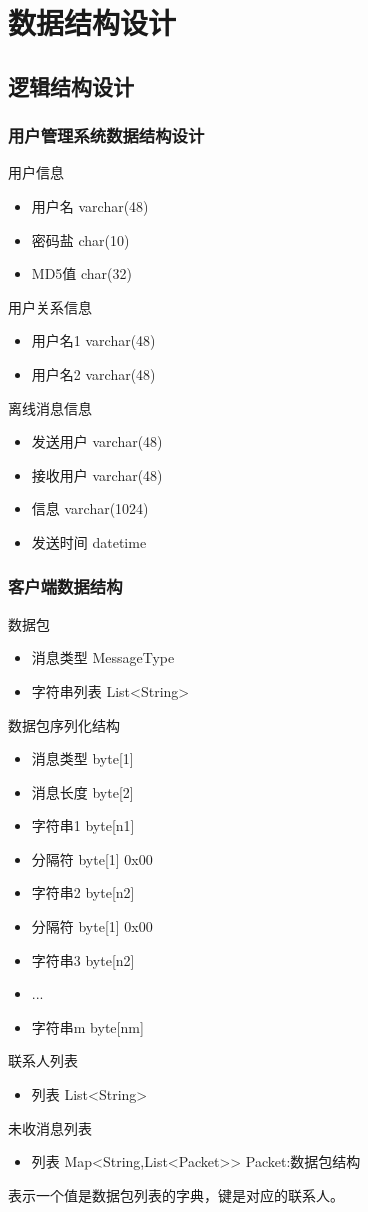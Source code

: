 \chapter{数据结构设计}
\section{逻辑结构设计}
\subsection{用户管理系统数据结构设计}
用户信息
	\begin{itemize}  	
		\item 用户名 varchar(48)
		\item 密码盐 char(10)
		\item MD5值 char(32)
	\end{itemize}
用户关系信息
	\begin{itemize}  	
		\item 用户名1 varchar(48)
		\item 用户名2 varchar(48)
\end{itemize}
离线消息信息
	\begin{itemize}
		\item 发送用户 varchar(48)
		\item 接收用户 varchar(48)
		\item 信息     varchar(1024)
		\item 发送时间 datetime
	\end{itemize}	
\subsection{客户端数据结构}
数据包
	\begin{itemize}
		\item 消息类型 MessageType
		\item 字符串列表 List<String>
	\end{itemize}	
数据包序列化结构
	\begin{itemize}
		\item 消息类型 byte[1]
		\item 消息长度 byte[2]
		\item 字符串1  byte[n1]
		\item 分隔符   byte[1] 0x00 
		\item 字符串2  byte[n2]
		\item 分隔符   byte[1] 0x00
		\item 字符串3  byte[n2]
		\item ...
		\item 字符串m  byte[nm]
\end{itemize}	
联系人列表
\begin{itemize}
	\item 列表 List<String>
\end{itemize}
未收消息列表
	\begin{itemize}
		\item 列表 Map<String,List<Packet>> Packet:数据包结构\\
	\end{itemize}
	表示一个值是数据包列表的字典，键是对应的联系人。
